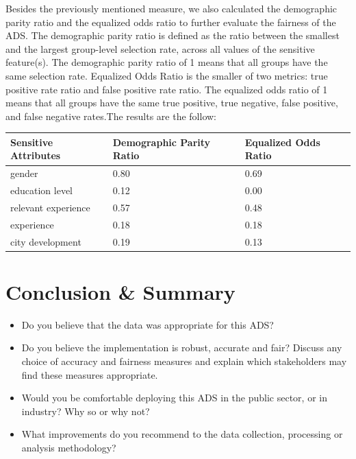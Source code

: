 Besides the previously mentioned measure, we also calculated the demographic parity ratio and the equalized odds ratio to further evaluate the fairness of the ADS. The demographic parity ratio is defined as the ratio between the smallest and the largest group-level selection rate, across all values of the sensitive feature(s). The demographic parity ratio of 1 means that all groups have the same selection rate. Equalized Odds Ratio is the smaller of two metrics: true positive rate ratio and false positive rate ratio. The equalized odds ratio of 1 means that all groups have the same true positive, true negative, false positive, and false negative rates.The results are the follow:
\begin{table}[h]
\centering
\begin{tabular}{ |p{4cm}||p{3cm}||p{3cm}|}
 \hline
Sensitive Attributes 		& Demographic Parity Ratio & Equalized Odds Ratio\\
 \hline

gender 	& 0.80 & 0.69 \\

education level 	& 0.12 & 0.00\\

relevant experience 	& 0.57 & 0.48\\

experience & 0.18 & 0.18\\

city development		 & 0.19 & 0.13\\

 \hline
\end{tabular}
\end{table}

\pagebreak

\section{Conclusion \& Summary}



\begin{itemize}
\item Do you believe that the data was appropriate for this ADS?  
\item Do you believe the implementation is robust, accurate and fair?  Discuss any choice of accuracy and fairness measures and explain which stakeholders may find these measures appropriate.
\item Would you be comfortable deploying this ADS in the public sector, or in industry?  Why so or why not?
\item What improvements do you recommend to the data collection, processing or analysis methodology?
\end{itemize}


